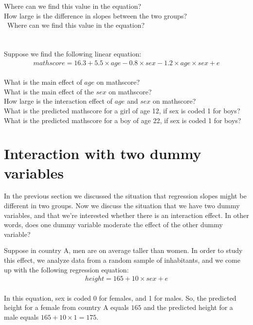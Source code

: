 \documentclass[]{report}\usepackage[]{graphicx}\usepackage[]{color}
\begin{document}
Where can we find this value in the equation?\\
How large is the difference in slopes between the two groups?\\\
Where can we find this value in the equation?\\
\\
\\
Suppose we find the following linear equation:
\\
\begin{eqnarray} 
mathscore = 16.3 + 5.5  \times age - 0.8  \times sex - 1.2  \times age  \times sex + e \nonumber
\end{eqnarray}
\\
What is the main effect of $age$ on mathscore? \\
What is the main effect of the $sex$ on mathscore?\\
How large is the interaction effect of $age$ and $sex$ on mathscore?\\
What is the predicted mathscore for a girl of age 12, if sex is coded 1 for boys?\\
What is the predicted mathscore for a boy of age 22, if sex is coded 1 for boys?




\section{Interaction with two dummy variables}


In the previous section we discussed the situation that regression slopes might be different in two groups. Now we discuss the situation that we have two dummy variables, and that we're interested whether there is an interaction effect. In other words, does one dummy variable moderate the effect of the other dummy variable?

Suppose in country A, men are on average taller than women. In order to study this effect, we analyze data from a random sample of inhabitants, and we come up with the following regression equation:
\\
\begin{eqnarray} 
height = 165 + 10  \times sex + e \nonumber
\end{eqnarray}
\\
In this equation, sex is coded 0 for females, and 1 for males. So, the predicted height for a female from country A equals $165$ and the predicted height for a male equals $165 + 10 \times 1 = 175$.\\
\end{document}
